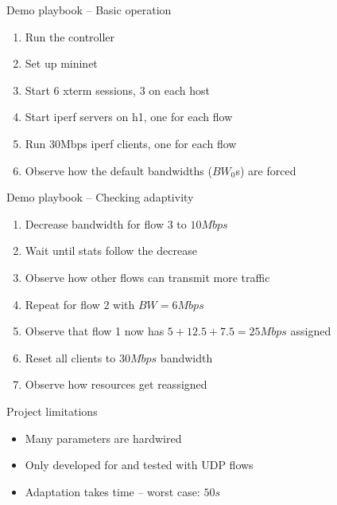 \documentclass[12pt,aspectratio=169]{beamer}
\begin{document}
\begin{frame}[label=demo-playbook-1]{Demo playbook -- Basic operation}
	\begin{enumerate}
		\item Run the controller
		\item Set up mininet
		\item Start 6 xterm sessions, 3 on each host
		\item Start iperf servers on h1, one for each flow
		\item Run 30Mbps iperf clients, one for each flow
		\item Observe how the default bandwidths ($BW_0$s) are forced
	\end{enumerate}
\end{frame}

\begin{frame}[label=demo-playbook-2]{Demo playbook -- Checking adaptivity}
	\begin{enumerate}
		\item Decrease bandwidth for flow 3 to $10Mbps$
		\item Wait until stats follow the decrease
		\item Observe how other flows can transmit more traffic
		\item Repeat for flow 2 with $BW=6Mbps$
		\item Observe that flow 1 now has $5 + 12.5 + 7.5 = 25Mbps$ assigned
		\item Reset all clients to $30Mbps$ bandwidth
		\item Observe how resources get reassigned
	\end{enumerate}
\end{frame}

\begin{frame}[label=project-limitations]{Project limitations}
	\begin{itemize}
		\item Many parameters are hardwired
		\item Only developed for and tested with UDP flows
		\item Adaptation takes time -- worst case: $50s$
	\end{itemize}
\end{frame}
\end{document}
